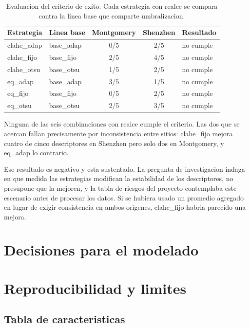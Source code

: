 \documentclass[11pt,a4paper]{article}
\begin{document}
\begin{table}[H]
\centering
\small
\caption{Evaluacion del criterio de exito. Cada estrategia con realce se
compara contra la linea base que comparte umbralizacion.}
\begin{tabular}{@{}llccl@{}}
\toprule
\textbf{Estrategia} & \textbf{Linea base} & \textbf{Montgomery} & \textbf{Shenzhen} & \textbf{Resultado} \\
\midrule
clahe\_adap & base\_adap & 0/5 & 2/5 & no cumple \\
clahe\_fijo & base\_fijo & 2/5 & 4/5 & no cumple \\
clahe\_otsu & base\_otsu & 1/5 & 2/5 & no cumple \\
eq\_adap & base\_adap & 3/5 & 1/5 & no cumple \\
eq\_fijo & base\_fijo & 0/5 & 2/5 & no cumple \\
eq\_otsu & base\_otsu & 2/5 & 3/5 & no cumple \\
\bottomrule
\end{tabular}
\end{table}

Ninguna de las seis combinaciones con realce cumple el criterio. Las dos que
se acercan fallan precisamente por inconsistencia entre sitios: clahe\_fijo
mejora cuatro de cinco descriptores en Shenzhen pero solo dos en Montgomery, y
eq\_adap lo contrario.

Ese resultado es negativo y esta sustentado. La pregunta de investigacion
indaga en que medida las estrategias modifican la estabilidad de los
descriptores, no presupone que la mejoren, y la tabla de riesgos del proyecto
contemplaba este escenario antes de procesar los datos. Si se hubiera usado un
promedio agregado en lugar de exigir consistencia en ambos origenes,
clahe\_fijo habria parecido una mejora.

\section{Decisiones para el modelado}



\section{Reproducibilidad y limites}

\subsection{Tabla de caracteristicas}
\end{document}
